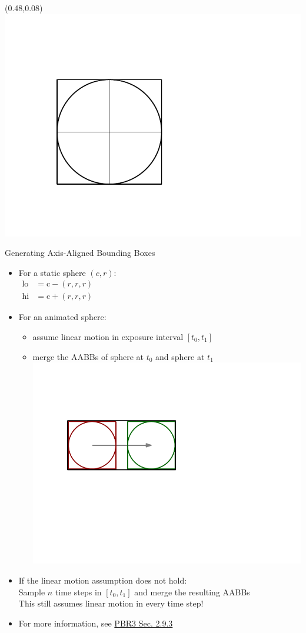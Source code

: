 \documentclass[utf8,stillsansserifmath,fleqn,t]{beamer}
\begin{document}
\begin{frame}
\frametitle{\insertsection}
\begin{textblock}{0.15}(0.48,0.08) \includegraphics[width=\textwidth]{./fig/aabb-sphere-0.pdf} \end{textblock}
Generating Axis-Aligned Bounding Boxes
\begin{itemize}
\item For a static sphere $(c,r)$:\\
    $\begin{aligned}
    \text{lo} &= \text{c} - (r,r,r)\\
    \text{hi} &= \text{c} + (r,r,r)\end{aligned}$
\item For an animated sphere:
    \begin{itemize}
    \item assume linear motion in exposure interval $[t_0, t_1]$
    \item merge the AABBs of sphere at $t_0$ and sphere at $t_1$\\
    \includegraphics[width=.35\textwidth]{./fig/aabb-sphere-1.pdf}
    \end{itemize}
\item If the linear motion assumption does not hold:\\
    Sample $n$ time steps in $[t_0,t_1]$ and merge the resulting AABBs\\
    This still assumes linear motion in every time step!
\item For more information, see \href{https://www.pbr-book.org/3ed-2018/Geometry_and_Transformations/Animating_Transformations}{PBR3 Sec. 2.9.3}
\end{itemize}
\end{frame}
\end{document}
